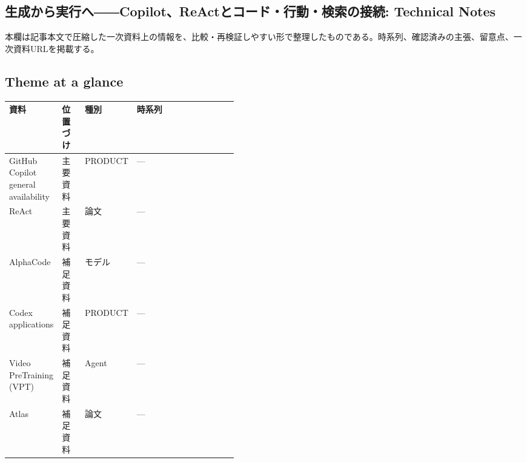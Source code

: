 \subsection*{生成から実行へ――Copilot、ReActとコード・行動・検索の接続: Technical Notes}
本欄は記事本文で圧縮した一次資料上の情報を、比較・再検証しやすい形で整理したものである。時系列、確認済みの主張、留意点、一次資料URLを掲載する。
\smallskip
{}\par
\medskip
\subsection*{Theme at a glance}
\begin{center}
\footnotesize
\begin{tabularx}{\linewidth}{@{}p{0.20\linewidth}p{0.10\linewidth}p{0.14\linewidth}X@{}}
\toprule
資料 & 位置づけ & 種別 & 時系列 \\
\midrule
GitHub Copilot general availability & 主要資料 & PRODUCT & — \\
ReAct & 主要資料 & 論文 & — \\
AlphaCode & 補足資料 & モデル & — \\
Codex applications & 補足資料 & PRODUCT & — \\
Video PreTraining (VPT) & 補足資料 & Agent & — \\
Atlas & 補足資料 & 論文 & — \\
\bottomrule
\end{tabularx}
\end{center}
\normalsize

